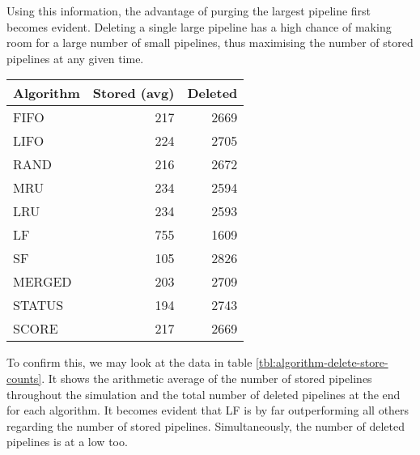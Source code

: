         Using this information, the advantage of purging the largest pipeline first becomes evident. Deleting a single large pipeline has a high chance of making room for a large number of small pipelines, thus maximising the number of stored pipelines at any given time.
        
        \begin{Figure}
            \begin{center}
                \begin{tabular}{ l | r | r }
                    Algorithm & Stored (avg) & Deleted \\ \hline \hline
                    FIFO & 217 & 2669\\
                    LIFO & 224 & 2705\\
                    RAND & 216 & 2672\\ \hline
                    MRU & 234 & 2594\\
                    LRU & 234 & 2593\\
                    \rowcolor{nordakademie-blue!10}LF & 755 & 1609\\
                    SF & 105 & 2826\\
                    MERGED & 203 & 2709\\
                    STATUS & 194 & 2743\\ \hline
                    SCORE & 217 & 2669\\
                \end{tabular}
            \end{center}
            \label{tbl:algorithm-delete-store-counts}
        \end{Figure}
        
        To confirm this, we may look at the data in table \ref{tbl:algorithm-delete-store-counts}. It shows the arithmetic average of the number of stored pipelines throughout the simulation and the total number of deleted pipelines at the end for each algorithm. It becomes evident that LF is by far outperforming all others regarding the number of stored pipelines. Simultaneously, the number of deleted pipelines is at a low too.
        
